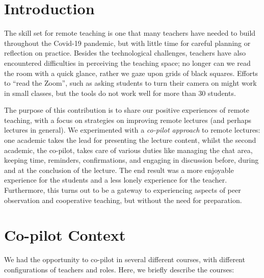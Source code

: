 \documentclass[sigconf,natbib=false]{acmart}
\begin{document}


\maketitle

\section{Introduction}

The skill set for remote teaching is one that many teachers have needed to  build throughout the Covid-19 pandemic, but with little time for careful planning or reflection on practice. Besides the technological challenges, teachers have also encountered difficulties in perceiving the teaching space; no longer can we read the room with a quick glance, rather we gaze upon grids of black squares.
Efforts to \enquote{read the Zoom}, such as asking students to turn their 
camera on might work in small classes, but the tools do not work well for more 
than 30 students.

The purpose of this contribution is to share our positive experiences of remote 
teaching, with a focus on strategies on improving remote lectures (and perhaps 
lectures in general). We experimented with a \emph{co-pilot approach} to remote 
lectures: one academic takes the lead for presenting the lecture content, 
whilst the second academic, the co-pilot, takes care of various duties like 
managing the chat area, keeping time, reminders, confirmations, and engaging in 
discussion before, during and at the conclusion of the lecture. The end result 
was a more enjoyable experience for the students and a less lonely experience 
for the teacher. Furthermore, this turns out to be a gateway to experiencing 
aspects of peer observation and cooperative teaching, but without the need for 
preparation.

\section{Co-pilot Context}
We had the opportunity to co-pilot in several different courses, with different 
configurations of teachers and roles. Here, we briefly describe the courses:
\end{document}

